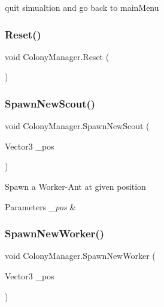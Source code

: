 quit simualtion and go back to main\+Menu 

\mbox{\label{class_colony_manager_affb94ecd21092f1ae1dd0c07877c1765}} 
\subsubsection{\texorpdfstring{Reset()}{Reset()}}
{\footnotesize\ttfamily void Colony\+Manager.\+Reset (\begin{DoxyParamCaption}{ }\end{DoxyParamCaption})}

\mbox{\label{class_colony_manager_a6f16173095c6022fa35742883f6c8e45}} 
\subsubsection{\texorpdfstring{SpawnNewScout()}{SpawnNewScout()}}
{\footnotesize\ttfamily void Colony\+Manager.\+Spawn\+New\+Scout (\begin{DoxyParamCaption}\item[{Vector3}]{\+\_\+pos }\end{DoxyParamCaption})}



Spawn a Worker-\/\+Ant at given position 


\begin{DoxyParams}{Parameters}
{\em \+\_\+pos} & \\
\hline
\end{DoxyParams}
\mbox{\label{class_colony_manager_ab8d9246488bc5ccb35cca453a3b4db11}} 
\subsubsection{\texorpdfstring{SpawnNewWorker()}{SpawnNewWorker()}}
{\footnotesize\ttfamily void Colony\+Manager.\+Spawn\+New\+Worker (\begin{DoxyParamCaption}\item[{Vector3}]{\+\_\+pos }\end{DoxyParamCaption})}



